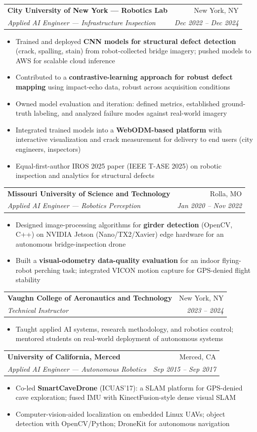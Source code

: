 \documentclass[letterpaper,10pt]{article}
\makeatletter
\newcommand{\resumeBullet}[1]{
  \item\small{#1 \vspace{-2pt}}
}
\newcommand{\resumeSubheading}[4]{
  \vspace{-1pt}\item
    \begin{tabular*}{0.97\textwidth}{l@{\extracolsep{\fill}}r}
      \textbf{#1} & #2 \\
      \textit{\small#3} & \textit{\small #4} \\
    \end{tabular*}\vspace{-5pt}
}
\newcommand{\resumeItemListStart}{\begin{itemize}}
\newcommand{\resumeItemListEnd}{\end{itemize}\vspace{-5pt}}
\makeatother
\begin{document}
    \resumeSubheading
      {City University of New York --- Robotics Lab}{New York, NY}
      {Applied AI Engineer --- Infrastructure Inspection}{Dec 2022 -- Dec 2024}
      \resumeItemListStart
        \resumeBullet{Trained and deployed \textbf{CNN models for structural defect detection} (crack, spalling, stain) from robot-collected bridge imagery; pushed models to AWS for scalable cloud inference}
        \resumeBullet{Contributed to a \textbf{contrastive-learning approach for robust defect mapping} using impact-echo data, robust across acquisition conditions}
        \resumeBullet{Owned model evaluation and iteration: defined metrics, established ground-truth labeling, and analyzed failure modes against real-world imagery}
        \resumeBullet{Integrated trained models into a \textbf{WebODM-based platform} with interactive visualization and crack measurement for delivery to end users (city engineers, inspectors)}
        \resumeBullet{Equal-first-author IROS 2025 paper (IEEE T-ASE 2025) on robotic inspection and analytics for structural defects}
      \resumeItemListEnd

    \resumeSubheading
      {Missouri University of Science and Technology}{Rolla, MO}
      {Applied AI Engineer --- Robotics Perception}{Jan 2020 -- Nov 2022}
      \resumeItemListStart
        \resumeBullet{Designed image-processing algorithms for \textbf{girder detection} (OpenCV, C++) on NVIDIA Jetson (Nano/TX2/Xavier) edge hardware for an autonomous bridge-inspection drone}
        \resumeBullet{Built a \textbf{visual-odometry data-quality evaluation} for an indoor flying-robot perching task; integrated VICON motion capture for GPS-denied flight stability}
      \resumeItemListEnd

    \resumeSubheading
      {Vaughn College of Aeronautics and Technology}{New York, NY}
      {Technical Instructor}{2023 -- 2024}
      \resumeItemListStart
        \resumeBullet{Taught applied AI systems, research methodology, and robotics control; mentored students on real-world deployment of autonomous systems}
      \resumeItemListEnd

    \resumeSubheading
      {University of California, Merced}{Merced, CA}
      {Applied AI Engineer --- Autonomous Robotics}{Sep 2015 -- Sep 2017}
      \resumeItemListStart
        \resumeBullet{Co-led \textbf{SmartCaveDrone} (ICUAS'17): a SLAM platform for GPS-denied cave exploration; fused IMU with KinectFusion-style dense visual SLAM}
        \resumeBullet{Computer-vision-aided localization on embedded Linux UAVs; object detection with OpenCV/Python; DroneKit for autonomous navigation}
      \resumeItemListEnd
\end{document}
